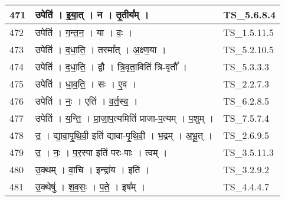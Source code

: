 \documentclass[17pt]{extarticle}
\begin{document}
\begin{longtable}{||p{0.4in}||p{4.9in}||p{0.9in}||}
    \hline
        
    471 & उपेति॑   ।   इ॒या॒त्   ।   न   ।   तृ॒तीय᳚म्   ।    & TS\_5.6.8.4       \\
    
    \hline
        
    472 & उपेति॑   ।   ग॒न्त॒न॒   ।   या   ।   वः॒   ।    & TS\_1.5.11.5       \\
    
    \hline
        
    473 & उपेति॑   ।   द॒धा॒ति॒   ।   तस्मा᳚त्   ।   अ॒क्ष्ण॒या   ।    & TS\_5.2.10.5       \\
    
    \hline
        
    474 & उपेति॑   ।   द॒धा॒ति॒   ।   द्वौ   ।   त्रि॒वृता॒विति॑ त्रि{-}वृतौ᳚   ।    & TS\_5.3.3.3       \\
    
    \hline
        
    475 & उपेति॑   ।   धा॒व॒ति॒   ।   सः   ।   ए॒व   ।    & TS\_2.2.7.3       \\
    
    \hline
        
    476 & उपेति॑   ।   नः॒   ।   एति॑   ।   व॒र्त॒स्व॒   ।    & TS\_6.2.8.5       \\
    
    \hline
        
    477 & उपेति॑   ।   य॒न्ति॒   ।   प्रा॒जा॒प॒त्यमिति॑ प्राजा{-}प॒त्यम्   ।   प॒शुम्   ।    & TS\_7.5.7.4       \\
    
    \hline
        
    478 & उ॒   ।   द्या॒वा॒पृ॒थि॒वी॒ इति॑ द्यावा{-}पृ॒थि॒वी॒   ।   भ॒द्रम्   ।   अ॒भू॒त्   ।    & TS\_2.6.9.5       \\
    
    \hline
        
    479 & उ॒   ।   नः॒   ।   प॒र॒स्पा इति॑ परः{-}पाः   ।   त्वम्   ।    & TS\_3.5.11.3       \\
    
    \hline
        
    480 & उ॒क्थम्   ।   वा॒चि   ।   इन्द्रा॑य   ।   इति॑   ।    & TS\_3.2.9.2       \\
    
    \hline
        
    481 & उ॒क्थेषु॑   ।   श॒व॒सः॒   ।   प॒ते॒   ।   इष᳚म्   ।    & TS\_4.4.4.7       \\
    

\end{longtable}
\end{document}
